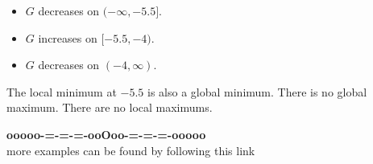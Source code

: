 \documentclass{ximera}
\begin{document}
\begin{example}
\begin{explanation}
\begin{itemize}
\item $G$ decreases on $(-\infty, -5.5]$.
\item $G$ increases on $[-5.5, -4)$.
\item $G$ decreases on $(-4, \infty)$.
\end{itemize}



The local minimum at $-5.5$ is also a global minimum.  There is no global maximum.  There are no local maximums.


\end{explanation}

\end{example}

























\begin{center}
\textbf{\textcolor{green!50!black}{ooooo-=-=-=-ooOoo-=-=-=-ooooo}} \\

more examples can be found by following this link\\ 

\end{center}
\end{document}
